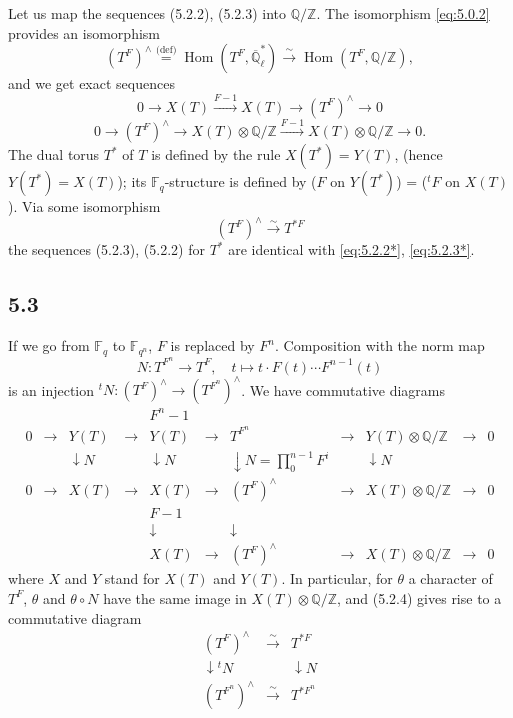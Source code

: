 \documentclass[11pt]{amsart}
\theoremstyle{plain}
\theoremstyle{remark}
\DeclareMathOperator{\Hom}{Hom}
\begin{document}
Let us map the sequences (5.2.2), (5.2.3) into $\mathbb{Q}/\mathbb{Z}$. The isomorphism \eqref{eq:5.0.2} provides an isomorphism
\[
(T^F)^\wedge \overset{\text{(def)}}{=} \Hom(T^F, \overline{\mathbb{Q}}_\ell^*) \xrightarrow{\sim} \Hom(T^F, \mathbb{Q}/\mathbb{Z}),
\]
and we get exact sequences
\begin{equation}\label{eq:5.2.2*}
0 \longrightarrow X(T) \xrightarrow{F-1} X(T) \longrightarrow (T^F)^\wedge \longrightarrow 0
\end{equation}
\begin{equation}\label{eq:5.2.3*}
0 \longrightarrow (T^F)^\wedge \longrightarrow X(T) \otimes \mathbb{Q}/\mathbb{Z} \xrightarrow{F-1} X(T) \otimes \mathbb{Q}/\mathbb{Z} \longrightarrow 0.
\end{equation}
The dual torus $T^*$ of $T$ is defined by the rule $X(T^*) = Y(T)$, (hence $Y(T^*) = X(T)$); its $\mathbb{F}_q$-structure is defined by ($F$ on $Y(T^*)$) = (${}^tF$ on $X(T)$). Via some isomorphism
\begin{equation}\label{eq:5.2.4}
(T^F)^\wedge \xrightarrow{\sim} T^{*F}
\end{equation}
the sequences (5.2.3), (5.2.2) for $T^*$ are identical with \eqref{eq:5.2.2*}, \eqref{eq:5.2.3*}.

\subsection{5.3} If we go from $\mathbb{F}_q$ to $\mathbb{F}_{q^n}$, $F$ is replaced by $F^n$. Composition with the norm map
\[
N: T^{F^n} \longrightarrow T^F, \quad t \mapsto t \cdot F(t) \cdots F^{n-1}(t)
\]
is an injection $^tN: (T^F)^\wedge \to (T^{F^n})^\wedge$. We have commutative diagrams
\[
\begin{array}{ccccccccccc}
& & & & F^n-1 & & & & & & \\
0 & \longrightarrow & Y(T) & \longrightarrow & Y(T) & \longrightarrow & T^{F^n} & \longrightarrow & Y(T) \otimes \mathbb{Q}/\mathbb{Z} & \longrightarrow & 0 \\
& & \downarrow{N} & & \downarrow{N} & & \downarrow{N = \prod_0^{n-1}F^i} & & \downarrow{N} & & \\
0 & \longrightarrow & X(T) & \longrightarrow & X(T) & \longrightarrow & (T^F)^\wedge & \longrightarrow & X(T) \otimes \mathbb{Q}/\mathbb{Z} & \longrightarrow & 0 \\
& & & & F-1 & & & & & & \\
& & & & \downarrow & & \downarrow & & & & \\
& & & & X(T) & \longrightarrow & (T^F)^\wedge & \longrightarrow & X(T) \otimes \mathbb{Q}/\mathbb{Z} & \longrightarrow & 0
\end{array}
\]
where $X$ and $Y$ stand for $X(T)$ and $Y(T)$. In particular, for $\theta$ a character of $T^F$, $\theta$ and $\theta \circ N$ have the same image in $X(T) \otimes \mathbb{Q}/\mathbb{Z}$, and (5.2.4) gives rise to a commutative diagram
\[
\begin{array}{ccc}
(T^F)^\wedge & \xrightarrow{\sim} & T^{*F} \\
\downarrow{^tN} & & \downarrow{N} \\
(T^{F^n})^\wedge & \xrightarrow{\sim} & T^{*F^n}
\end{array}
\]
\end{document}
